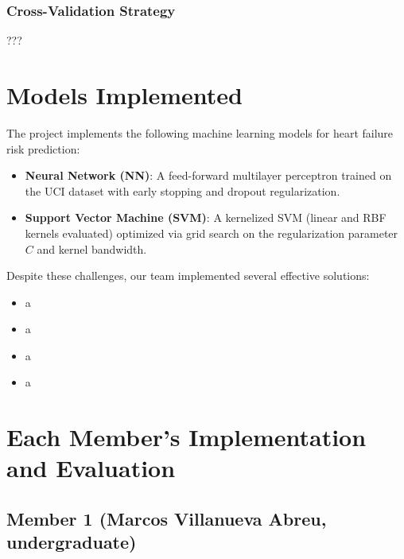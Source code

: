 \documentclass[11pt,a4paper]{article}
\begin{document}
\subsubsection{Cross-Validation Strategy}
\vspace{-0.25cm}
???

\section{Models Implemented}
The project implements the following machine learning models for heart
failure risk prediction:
\begin{itemize}
    \vspace{-0.25cm}
    \item \textbf{Neural Network (NN)}: A feed-forward multilayer perceptron trained on the UCI dataset with early stopping and dropout regularization.
    \item \textbf{Support Vector Machine (SVM)}: A kernelized SVM (linear and RBF kernels evaluated) optimized via grid search on the regularization parameter $C$ and kernel bandwidth.
\end{itemize}


\begin{tcolorbox}[infobox={Insights and Solutions}]
    Despite these challenges, our team implemented several effective solutions:
    \vspace{-0.25cm}
    \begin{itemize}
        \item a
        \item a
        \item a
        \item a
    \end{itemize}
\end{tcolorbox}

\section{Each Member's Implementation and Evaluation}

\subsection{Member 1 (Marcos Villanueva Abreu, undergraduate)}
\end{document}
